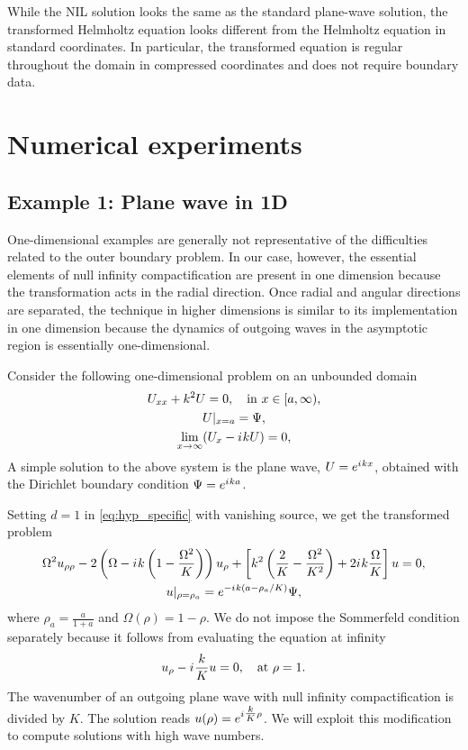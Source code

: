 \documentclass[final,onefignum,onetabnum]{siamart190516}
\newcommand{\iu}{{i\mkern1mu}}
\begin{document}
While the NIL solution looks the same as the standard plane-wave solution, the transformed Helmholtz equation looks different from the Helmholtz equation in standard coordinates. In particular, the transformed equation is regular throughout the domain in compressed coordinates and does not require boundary data. 

\section{Numerical experiments}\label{sec:numerical}
\subsection{Example 1: Plane wave in 1D}\label{sec:oned}
One-dimensional examples are generally not representative of the difficulties related to the outer boundary problem. In our case, however, the essential elements of null infinity compactification are present in one dimension because the transformation acts in the radial direction. Once radial and angular directions are separated, the technique in higher dimensions is similar to its implementation in one dimension because the dynamics of outgoing waves in the asymptotic region is essentially one-dimensional.

Consider the following one-dimensional problem on an unbounded domain
\begin{equation}
	\label{eq:oneD}
	\begin{gathered}
		U_{xx} + k^2 U = 0, \quad \mathrm{in} \ x\in[a,\infty),\\
		U|_{x=a} = \Psi,\\
		\lim_{x\to\infty} (U_x - \iu k U) = 0,
	\end{gathered}
\end{equation}
A simple solution to the above system is the plane wave, $U=e^{\iu k x}$, obtained with the Dirichlet boundary condition $\Psi=e^{\iu k a}$. 

Setting $d=1$ in \eqref{eq:hyp_specific} with vanishing source, we get the transformed problem
\begin{equation}
	\label{eq:hyp_1d}
	\begin{gathered}
		\Omega^2 u_{\rho\rho} - 2 \left(\Omega-\iu k \left(1-\frac{\Omega^2}{K}\right) \right) u_\rho + \left[k^2 \left(\frac{2}{K}-\frac{\Omega^2}{K^2}\right) + 2 \iu k \frac{\Omega}{K} \right] u = 0,\\
		u|_{\rho=\rho_a} = e^{-\iu k (a-\rho_a/K)}\Psi,
	\end{gathered}
\end{equation}
where $\rho_a=\tfrac{a}{1+a}$ and $\Omega(\rho)=1-\rho$. We do not impose the Sommerfeld condition separately because it follows from evaluating the equation at infinity 
\[ u_\rho - \iu \frac{k}{K} u = 0,   \quad \mathrm{at} \ \rho=1. \]
The wavenumber of an outgoing plane wave with null infinity compactification is divided by $K$. The solution reads $u(\rho)=e^{\iu \tfrac{k}{K} \rho}$. We will exploit this modification to compute solutions with high wave numbers.
\end{document}
